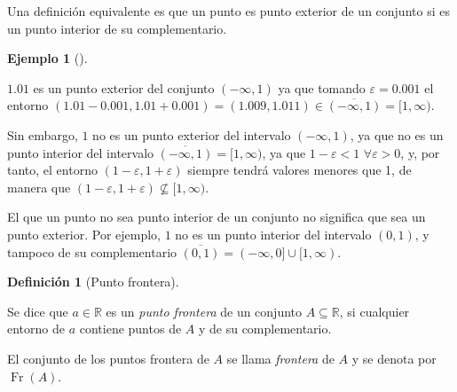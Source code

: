 \documentclass[
  a4paper,
]{scrreport}
\theoremstyle{definition}
\newtheorem{example}{Ejemplo}[chapter]
\theoremstyle{plain}
\theoremstyle{definition}
\newtheorem{definition}{Definición}[chapter]
\theoremstyle{definition}
\theoremstyle{plain}
\theoremstyle{plain}
\theoremstyle{remark}
\begin{document}
Una definición equivalente es que un punto es punto exterior de un
conjunto si es un punto interior de su complementario.

\begin{example}[]\protect\hypertarget{exm-punto-exterior}{}\label{exm-punto-exterior}

\(1.01\) es un punto exterior del conjunto \((-\infty, 1)\) ya que
tomando \(\varepsilon=0.001\) el entorno
\((1.01-0.001, 1.01+0.001)=(1.009, 1.011)\in \overline{(-\infty, 1)}=[1,\infty)\).

Sin embargo, \(1\) no es un punto exterior del intervalo
\((-\infty, 1)\), ya que no es un punto interior del intervalo
\(\overline{(-\infty, 1)}=[1,\infty)\), ya que \(1-\varepsilon < 1\)
\(\forall \varepsilon>0\), y, por tanto, el entorno
\((1-\varepsilon, 1+\varepsilon)\) siempre tendrá valores menores que 1,
de manera que
\((1-\varepsilon, 1+\varepsilon)\not \subseteq [1,\infty)\).

\end{example}

\begin{tcolorbox}[enhanced jigsaw, leftrule=.75mm, colbacktitle=quarto-callout-warning-color!10!white, toprule=.15mm, opacityback=0, opacitybacktitle=0.6, toptitle=1mm, breakable, bottomtitle=1mm, colframe=quarto-callout-warning-color-frame, rightrule=.15mm, titlerule=0mm, title=\textcolor{quarto-callout-warning-color}{\faExclamationTriangle}\hspace{0.5em}{Advertencia}, arc=.35mm, left=2mm, bottomrule=.15mm, colback=white, coltitle=black]

El que un punto no sea punto interior de un conjunto no significa que
sea un punto exterior. Por ejemplo, \(1\) no es un punto interior del
intervalo \((0,1)\), y tampoco de su complementario
\(\overline{(0,1)}=(-\infty, 0]\cup[1,\infty)\).

\end{tcolorbox}

\begin{definition}[Punto
frontera]\protect\hypertarget{def-punto-frontera}{}\label{def-punto-frontera}

Se dice que \(a\in \mathbb{R}\) es un \emph{punto frontera} de un
conjunto \(A\subseteq \mathbb{R}\), si cualquier entorno de \(a\)
contiene puntos de \(A\) y de su complementario.

El conjunto de los puntos frontera de \(A\) se llama \emph{frontera} de
\(A\) y se denota por \(\operatorname{Fr}(A)\).

\end{definition}
\end{document}

